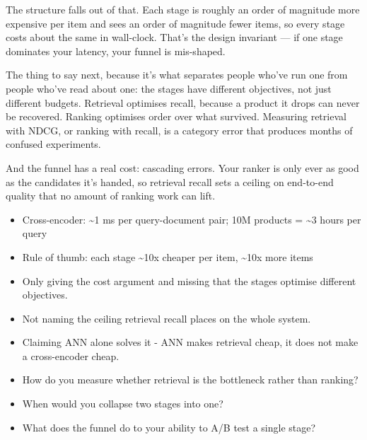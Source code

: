 \documentclass[10pt,twoside]{book}
\newcommand{\lab}[1]{\par\vspace{5pt}\noindent{\sffamily\footnotesize\bfseries\color{accent}#1}\par\vspace{1pt}}
\newcommand{\flab}[1]{\par\vspace{5pt}\noindent{\sffamily\footnotesize\bfseries\color{flag}#1}\par\vspace{1pt}}
\begin{document}
The structure falls out of that. Each stage is roughly an order of magnitude more expensive per item and sees an order of magnitude fewer items, so every stage costs about the same in wall-clock. That's the design invariant --- if one stage dominates your latency, your funnel is mis-shaped.\par\vspace{3pt}
The thing to say next, because it's what separates people who've run one from people who've read about one: the stages have different objectives, not just different budgets. Retrieval optimises recall, because a product it drops can never be recovered. Ranking optimises order over what survived. Measuring retrieval with NDCG, or ranking with recall, is a category error that produces months of confused experiments.\par\vspace{3pt}
And the funnel has a real cost: cascading errors. Your ranker is only ever as good as the candidates it's handed, so retrieval recall sets a ceiling on end-to-end quality that no amount of ranking work can lift.\par\vspace{3pt}
\lab{Numbers}
\begin{itemize}
\item Cross-encoder: \textasciitilde{}1 ms per query-document pair; 10M products = \textasciitilde{}3 hours per query
\item Rule of thumb: each stage \textasciitilde{}10x cheaper per item, \textasciitilde{}10x more items
\end{itemize}
\flab{Loses the signal}
\begin{itemize}
\item Only giving the cost argument and missing that the stages optimise different objectives.
\item Not naming the ceiling retrieval recall places on the whole system.
\item Claiming ANN alone solves it - ANN makes retrieval cheap, it does not make a cross-encoder cheap.
\end{itemize}
\lab{Then they ask}
\begin{itemize}
\item How do you measure whether retrieval is the bottleneck rather than ranking?
\item When would you collapse two stages into one?
\item What does the funnel do to your ability to A/B test a single stage?
\end{itemize}
\end{document}
